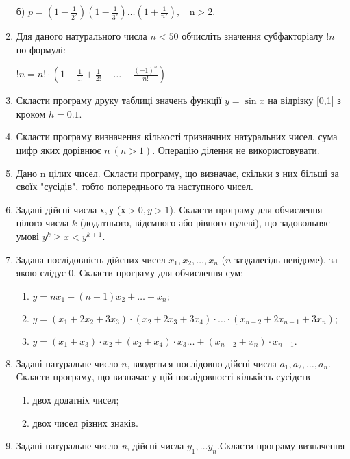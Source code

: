 \documentclass[]{article}
\makeatletter
\newcommand{\xslalph}[1]{\expandafter\@xslalph\csname c@#1\endcsname}
\newcommand{\@xslalph}[1]{%
    \ifcase#1\or а\or б\or в\or г\or д\or e\or є\or ж\or з\or i%
    \or й\or к\or л\or м\or н\or о\or п\or р\or с\or т%
    \or у\or ф\or х\or ц\or ч\or ш\or ю\or я\or аа\or бб\or вв %
    \else\@ctrerr\fi%
}
\makeatother
\begin{document}
\begin{enumerate}
б)
\(p = \left( 1 - \frac{1}{2^{2}} \right)\left( 1 - \frac{1}{3^{2}} \right)\ldots\left( 1 + \frac{1}{n^{2}} \right),\mathrm{\ \ \ \ n > 2.}\)

\item
Для даного натурального числа $n<50$ обчисліть значення субфакторіалу \(!n \) по формулі:

\( !n = n! \cdot \left( 1 - \frac{1}{1!} +\frac{1}{2!} -\ldots + \frac{(-1)^{n}}{n!} \right) \)

\item
  Скласти програму друку таблиці значень функції \(y = \sin x\) на
  відрізку {[}0,1{]} з кроком \(h = 0.1\).
\item
Скласти програму визначення кількості тризначних натуральних чисел, сума
цифр яких дорівнює \(n\ (n > 1).\) Операцію ділення не використовувати.
\item
Дано n цілих чисел. Скласти програму, що визначає, скільки з них більші
за своїх "сусідів", тобто попереднього та наступного чисел.

\item
Задані дійсні числа $х,у$ ($х>0, y>1$). Скласти програму для
обчислення цілого числа $k$ (додатнього, відємного або рівного нулеві), що
задовольняє умові $y^{k}\ge x <y^{k+1}$.
\item
Задана послідовність дійсних чисел $x_{1},x_{2},\ldots,x_{n}$ ($n$ заздалегідь невідоме), за якою слідує 0. 
Скласти програму для обчислення сум:
\begin{enumerate}[label=\xslalph*)]
\item
 \(  y = n x_{1} + (n-1) x_{2} + \ldots + x_{n}; \)
\item
 \(  y = (x_{1} + 2 x_{2} + 3x_{3})\cdot (x_{2} + 2 x_{3} + 3x_{4})\cdot \ldots \cdot(x_{n-2} + 2 x_{n-1} + 3x_{n}); \)
\item
 \(  y = (x_{1} + x_{3})\cdot x_{2} + (x_{2} + x_{4})\cdot x_{3} \ldots + (x_{n-2} + x_{n})\cdot x_{n-1}. \)
\end{enumerate}

\item
 Задані натуральне число $n$, вводяться послідовно дійсні числа $a_{1}, a_{2},\ldots, a_{n} $. Скласти
програму, що визначає у цій послідовності кількість сусідств
\begin{enumerate}[label=\xslalph*)]
\item
 двох додатніх чисел;
\item
двох чисел різних знаків.
\end{enumerate}

\item
  Задані натуральне число \emph{n}, дійсні числа
  \(y_{1},\ldots y_{n}.\)Скласти програму визначення


\end{enumerate}
\end{document}
